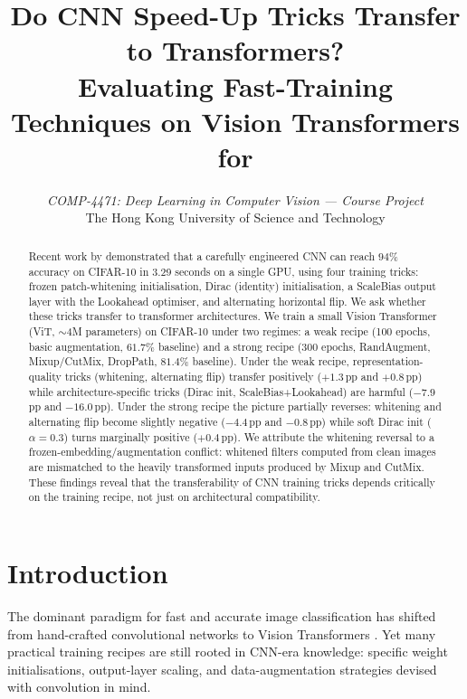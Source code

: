\documentclass[10pt,twocolumn]{article}
\title{%
    \textbf{Do CNN Speed-Up Tricks Transfer to Transformers?}\\
    \large Evaluating Fast-Training Techniques on Vision Transformers for {\cifar}
}
\author{
    \textit{COMP-4471: Deep Learning in Computer Vision --- Course Project}\\[2pt]
    The Hong Kong University of Science and Technology
}
\date{}
\newcommand{\pp}{\,pp}   %
\begin{document}
\maketitle

\begin{abstract}
    Recent work by \citet{garg2024cifar10} demonstrated that a carefully engineered CNN can reach $94\%$ accuracy on CIFAR-10 in 3.29 seconds on a single GPU, using four training tricks: frozen patch-whitening initialisation, Dirac (identity) initialisation, a ScaleBias output layer with the Lookahead optimiser, and alternating horizontal flip.
    We ask whether these tricks transfer to transformer architectures.
    We train a small Vision Transformer (ViT, $\sim$4M parameters) on CIFAR-10 under two regimes: a weak recipe (100 epochs, basic augmentation, $61.7\%$ baseline) and a strong recipe (300 epochs, RandAugment, Mixup/CutMix, DropPath, $81.4\%$ baseline).
    Under the weak recipe, representation-quality tricks (whitening, alternating flip) transfer positively ($+1.3$\pp{} and $+0.8$\pp{}) while architecture-specific tricks (Dirac init, ScaleBias+Lookahead) are harmful ($-7.9$\pp{} and $-16.0$\pp{}).
    Under the strong recipe the picture partially reverses: whitening and alternating flip become slightly negative ($-4.4$\pp{} and $-0.8$\pp{}) while soft Dirac init ($\alpha=0.3$) turns marginally positive ($+0.4$\pp{}).
    We attribute the whitening reversal to a frozen-embedding/augmentation conflict: whitened filters computed from clean images are mismatched to the heavily transformed inputs produced by Mixup and CutMix.
    These findings reveal that the transferability of CNN training tricks depends critically on the training recipe, not just on architectural compatibility.
\end{abstract}

\section{Introduction}\label{sec:intro}

The dominant paradigm for fast and accurate image classification has shifted from hand-crafted convolutional networks to Vision Transformers \citep{dosovitskiy2021vit}. Yet many practical training recipes are still rooted in CNN-era knowledge: specific weight initialisations, output-layer scaling, and data-augmentation strategies devised with convolution in mind.
\end{document}
